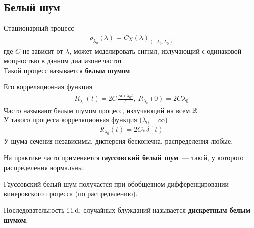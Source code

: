 \subsection{Белый шум}
\begin{Def}
Стационарный процесс
\begin{align*}
  & \rho_{\lambda_0}(\lambda) = C\chi(\lambda)_{(-\lambda_0, \lambda_0)}
\end{align*}
где $C$ не зависит от $\lambda$, может моделировать сигнал, излучающий с
одинаковой мощностью в данном диапазоне частот.
\\
Такой процесс называется \textbf{белым шумом}.
\end{Def}
Его корреляционная функция
\begin{align*}
  & R_{\lambda_0}(t) = 2C\frac{\sin \lambda_0 t}{t}, \ R_{\lambda_0}(0) = 2C\lambda_0
\end{align*}
Часто называют белым шумом процесс, излучающий на всем $\mathbb{R}$.
\\
У такого процесса корреляционная функция ($\lambda_0 = \infty$)
\begin{align*}
  & R_{\lambda_0}(t) = 2C\pi \delta(t)
\end{align*}
У шума сечения независимы, дисперсия бесконечна, распределения любые.
\begin{Def}
    На практике часто применяется \textbf{гауссовский белый шум}~--- такой, у
    которого распределения нормальны.
\end{Def}
\begin{Note}
    Гауссовский белый шум получается при обобщенном дифференцировании
    винеровского процесса (по распределению).
\end{Note}
\begin{Def}
    Последовательность $\text{i}.\text{i}.\text{d}.$ случайных блужданий называется \textbf{дискретным
      белым шумом}.
\end{Def}
